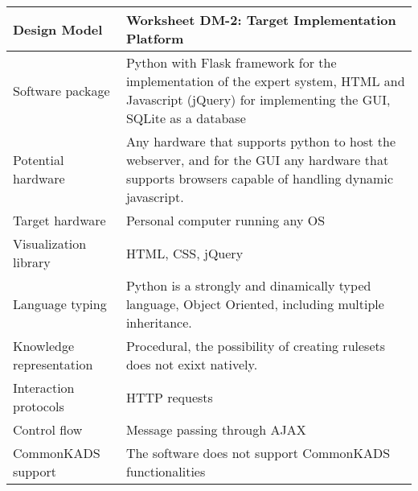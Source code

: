 \begin{tabular}{%
	|>{\colleft}p{3cm}%
	|>{\colleft}p{8cm}|}
\hline
\bf Design Model 	& \bf Worksheet DM-2: Target Implementation Platform \\
\hline\hline
\sc Software package & 
Python with Flask framework for the implementation of the expert system, HTML and Javascript (jQuery) for implementing the GUI, SQLite as a database
\\  \hline
\sc Potential hardware & 
Any hardware that supports python to host the webserver, and for the GUI any hardware that supports browsers capable of handling dynamic javascript.
\\ \hline
\sc Target hardware & 
Personal computer running any OS 
\\ \hline
\sc Visualization library &
HTML, CSS, jQuery 
\\ \hline
\sc Language typing &
Python is a strongly and dinamically typed language, Object Oriented, including multiple inheritance.
\\ \hline
\sc Knowledge representation & 
Procedural, the possibility of creating rulesets does not exixt natively.
\\ \hline
\sc Interaction protocols &
HTTP requests 
\\ \hline
\sc Control flow &
Message passing through AJAX
\\ \hline 
\sc CommonKADS support &
The software does not support CommonKADS functionalities
\\ \hline
\end{tabular}
